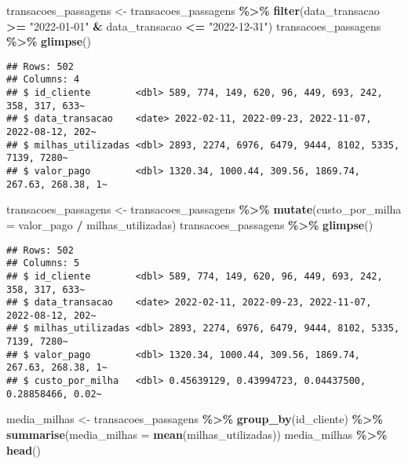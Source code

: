 \documentclass[
]{article}
\newenvironment{Shaded}{\begin{snugshade}}{\end{snugshade}}
\newcommand{\AttributeTok}[1]{\textcolor[rgb]{0.13,0.29,0.53}{#1}}
\newcommand{\FunctionTok}[1]{\textcolor[rgb]{0.13,0.29,0.53}{\textbf{#1}}}
\newcommand{\NormalTok}[1]{#1}
\newcommand{\OtherTok}[1]{\textcolor[rgb]{0.56,0.35,0.01}{#1}}
\newcommand{\SpecialCharTok}[1]{\textcolor[rgb]{0.81,0.36,0.00}{\textbf{#1}}}
\newcommand{\StringTok}[1]{\textcolor[rgb]{0.31,0.60,0.02}{#1}}
\begin{document}
\begin{Shaded}
\begin{Highlighting}[]
\NormalTok{transacoes\_passagens }\OtherTok{\textless{}{-}}\NormalTok{ transacoes\_passagens }\SpecialCharTok{\%\textgreater{}\%} \FunctionTok{filter}\NormalTok{(data\_transacao }\SpecialCharTok{\textgreater{}=} \StringTok{"2022{-}01{-}01"} \SpecialCharTok{\&}\NormalTok{ data\_transacao }\SpecialCharTok{\textless{}=} \StringTok{"2022{-}12{-}31"}\NormalTok{)}
\NormalTok{transacoes\_passagens }\SpecialCharTok{\%\textgreater{}\%} \FunctionTok{glimpse}\NormalTok{()}
\end{Highlighting}
\end{Shaded}

\begin{verbatim}
## Rows: 502
## Columns: 4
## $ id_cliente        <dbl> 589, 774, 149, 620, 96, 449, 693, 242, 358, 317, 633~
## $ data_transacao    <date> 2022-02-11, 2022-09-23, 2022-11-07, 2022-08-12, 202~
## $ milhas_utilizadas <dbl> 2893, 2274, 6976, 6479, 9444, 8102, 5335, 7139, 7280~
## $ valor_pago        <dbl> 1320.34, 1000.44, 309.56, 1869.74, 267.63, 268.38, 1~
\end{verbatim}

\begin{Shaded}
\begin{Highlighting}[]
\NormalTok{transacoes\_passagens }\OtherTok{\textless{}{-}}\NormalTok{ transacoes\_passagens }\SpecialCharTok{\%\textgreater{}\%} \FunctionTok{mutate}\NormalTok{(}\AttributeTok{custo\_por\_milha =}\NormalTok{ valor\_pago }\SpecialCharTok{/}\NormalTok{ milhas\_utilizadas)}
\NormalTok{transacoes\_passagens }\SpecialCharTok{\%\textgreater{}\%} \FunctionTok{glimpse}\NormalTok{()}
\end{Highlighting}
\end{Shaded}

\begin{verbatim}
## Rows: 502
## Columns: 5
## $ id_cliente        <dbl> 589, 774, 149, 620, 96, 449, 693, 242, 358, 317, 633~
## $ data_transacao    <date> 2022-02-11, 2022-09-23, 2022-11-07, 2022-08-12, 202~
## $ milhas_utilizadas <dbl> 2893, 2274, 6976, 6479, 9444, 8102, 5335, 7139, 7280~
## $ valor_pago        <dbl> 1320.34, 1000.44, 309.56, 1869.74, 267.63, 268.38, 1~
## $ custo_por_milha   <dbl> 0.45639129, 0.43994723, 0.04437500, 0.28858466, 0.02~
\end{verbatim}

\begin{Shaded}
\begin{Highlighting}[]
\NormalTok{media\_milhas }\OtherTok{\textless{}{-}}\NormalTok{ transacoes\_passagens }\SpecialCharTok{\%\textgreater{}\%} \FunctionTok{group\_by}\NormalTok{(id\_cliente) }\SpecialCharTok{\%\textgreater{}\%} \FunctionTok{summarise}\NormalTok{(}\AttributeTok{media\_milhas =} \FunctionTok{mean}\NormalTok{(milhas\_utilizadas))}
\NormalTok{media\_milhas }\SpecialCharTok{\%\textgreater{}\%} \FunctionTok{head}\NormalTok{()}
\end{Highlighting}
\end{Shaded}
\end{document}
